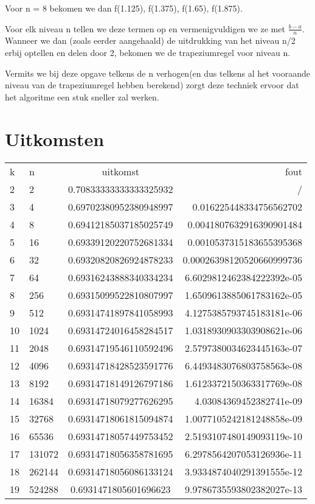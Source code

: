 \documentclass{article}
\begin{document}
\begin{flushleft}
Voor n = 8 bekomen we dan f(1.125), f(1.375), f(1.65), f(1.875).
\newline

Voor elk niveau n tellen we deze termen op en vermenigvuldigen we ze met $\frac{b-a}{n}$. Wanneer we dan (zoals eerder aangehaald) de uitdrukking van het niveau n/2 erbij optellen en delen door 2, bekomen we de trapeziumregel voor niveau n.
\newline

Vermits we bij deze opgave telkens de n verhogen(en dus telkens al het vooraande niveau van de trapeziumregel hebben berekend) zorgt deze techniek ervoor dat het algoritme een stuk sneller zal werken.
\section{Uitkomsten}

\begin{tabular}{l l c r }
  k & n & uitkomst & fout \\
  2 & 2 & 0.70833333333333325932  &  /\\
  3 & 4 & 0.69702380952380948997 & 0.016225448334756562702  \\
  4 & 8 & 0.69412185037185025749  & 0.0041807632916390901484 \\
  5 & 16 & 0.69339120220752681334 &0.0010537315183655395368  \\
  6 & 32 & 0.69320820826924878233  &  0.00026398120520660999736\\
  7 & 64 &  0.69316243888340334234 & 6.6029812462384222392e-05 \\
  8 & 256 &  0.69315099522810807997 & 1.6509613885061783162e-05 \\
  9 & 512 & 0.69314741897841058993  & 4.1275385793745183181e-06 \\
  10 & 1024 & 0.69314724016458284517  & 1.0318930903303908621e-06 \\
  11& 2048 & 0.69314719546110592496 & 2.5797380034623445163e-07  \\  
  12 & 4096   & 0.69314718428523591776  &6.4493483076803758563e-08  \\ 
   13 & 8192  &  0.69314718149126797186 & 1.6123372150363317769e-08 \\ 
  14 & 16384   & 0.69314718079277626295  &4.03084369452382741e-09 \\ 
  15 & 32768   &  0.69314718061815094874 &1.0077105242181248858e-09  \\ 
  16 & 65536   & 0.69314718057449753452  & 2.5193107480149093119e-10 \\ 
   17 & 131072  & 0.69314718056358781695  &6.2978564207053126936e-11  \\ 
  18 &  262144  & 0.69314718056086133124 & 3.9334874040291391555e-12 \\ 
   19 &  524288 & 0.6931471805601696623  &9.9786735593802382027e-13  \\                                                                                         
\end{tabular}
\newline


\end{flushleft}
\end{document}
